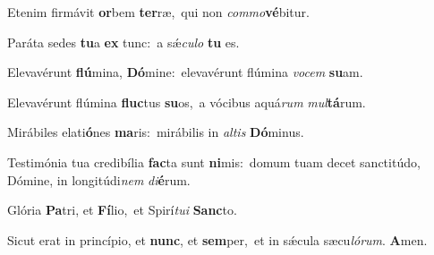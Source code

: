 Etenim firmávit \textbf{or}bem \textbf{ter}ræ,~\redgreheightstar qui non \textit{com}\textit{mo}\textbf{vé}bitur.

Paráta sedes \textbf{tu}a \textbf{ex} tunc:~\redgreheightstar a sǽ\textit{cu}\textit{lo} \textbf{tu} es.

Elevavérunt \textbf{flú}mina, \textbf{Dó}mine:~\redgreheightstar elevavérunt flúmina \textit{vo}\textit{cem} \textbf{su}am.

Elevavérunt flúmina \textbf{fluc}tus \textbf{su}os,~\redgreheightstar a vócibus aquá\textit{rum} \textit{mul}\textbf{tá}rum.

Mirábiles elati\textbf{ó}nes \textbf{ma}ris:~\redgreheightstar mirábilis in \textit{al}\textit{tis} \textbf{Dó}minus.

Testimónia tua credibília \textbf{fac}ta sunt \textbf{ni}mis:~\redgreheightstar domum tuam decet sanctitúdo, Dómine, in longitúdi\textit{nem} \textit{di}\textbf{é}rum.

Glória \textbf{Pa}tri, et \textbf{Fí}lio,~\redgreheightstar et Spirí\textit{tu}\textit{i} \textbf{Sanc}to.

Sicut erat in princípio, et \textbf{nunc}, et \textbf{sem}per,~\redgreheightstar et in sǽcula sæcu\textit{ló}\textit{rum}. \textbf{A}men.

